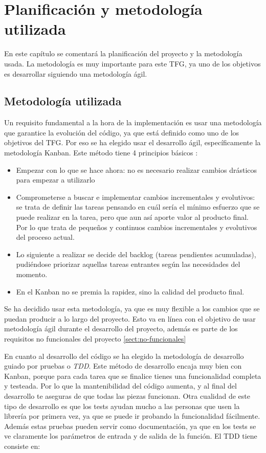 \chapter{Planificación y metodología utilizada}

En este capítulo se comentará la planificación del proyecto y la metodología usada. La metodología
es muy importante para este TFG, ya uno de los objetivos es desarrollar siguiendo una metodología
ágil.

\section{Metodología utilizada}

Un requisito fundamental a la hora de la implementación es usar una metodología que garantice la evolución del código,
ya que está definido como uno de los objetivos del TFG. Por eso se ha elegido usar el desarrollo ágil, específicamente 
la metodología Kanban. Este método tiene 4 principios básicos \cite{kanban}:

\begin{itemize}
    \item Empezar con lo que se hace ahora: no es necesario realizar cambios drásticos para empezar a utilizarlo
    \item Comprometerse a buscar e implementar cambios incrementales y evolutivos: se trata de definir las tareas
    pensando en cuál sería el mínimo esfuerzo que se puede realizar en la tarea, pero que aun así aporte valor al producto final.
    Por lo que trata de pequeños y continuos cambios incrementales y evolutivos del proceso actual.
    \item Lo siguiente a realizar se decide del backlog (tareas pendientes acumuladas), pudiéndose priorizar aquellas 
    tareas entrantes según las necesidades del momento.
    \item  En el Kanban no se premia la rapidez, sino la calidad del producto final.
\end{itemize}

Se ha decidido usar esta metodología, ya que es muy flexible a los cambios que se puedan producir a lo largo del proyecto. Esto va en
línea con el objetivo de usar metodología ágil durante el desarrollo del proyecto, además es parte de los requisitos no funcionales del proyecto \ref{sect:no-funcionales}

En cuanto al desarrollo del código se ha elegido la metodología de desarrollo guiado por pruebas o \emph{TDD}. Este método
de desarrollo encaja muy bien con Kanban, porque para cada tarea que se finalice tienes una funcionalidad completa y testeada. Por
lo que la mantenibilidad del código aumenta, y al final del desarrollo te aseguras de que todas las piezas funcionan. Otra cualidad de
este tipo de desarrollo es que los tests ayudan mucho a las personas que usen la librería por primera vez, ya que se puede 
ir probando la funcionalidad fácilmente. Además estas pruebas pueden servir como documentación, ya que en los tests se ve claramente 
los parámetros de entrada y de salida de la función. El TDD tiene consiste en:

